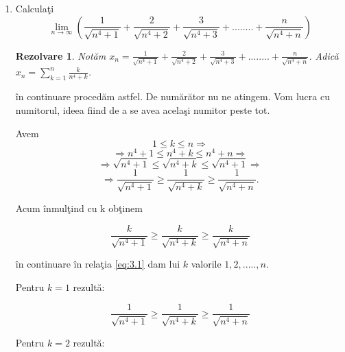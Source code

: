 \documentclass[a4paper,12pt,oneside]{report}
\newtheorem{solve}{Rezolvare}
\begin{document}
\begin{enumerate}
 \item Calcula\c ti
\begin{displaymath}
   \lim_{n\to\infty }\left ( \frac{1}{\sqrt{n^{4}+1}}+ \frac{2}{\sqrt{n^{4}+2} } +\frac{3}{\sqrt{n^{4}+3}}+........+\frac{n}{\sqrt{n^{4}+n}}  \right )
\end{displaymath}


\begin{solve}
  Not\u am \( x_{n}= \frac{1}{\sqrt{n^{4}+1}} + \frac{2}{\sqrt{n^{4}+2}}+\frac{3}{\sqrt{n^{4}+3}}+........+\frac{n}{\sqrt{n^{4}+n}} \).
Adic\u a \( x_{n}= \sum_{k=1}^{n}\frac{k}{n^{4}+k}\).
\end{solve}


\^ in continuare proced\u am astfel. De num\u ar\u ator nu ne atingem. Vom lucra cu numitorul, ideea fiind de a se avea acela\c si numitor peste tot. 

Avem 
\begin{displaymath}
  1\leq k\leq n \Rightarrow 
\end{displaymath}
\begin{displaymath}
  \Rightarrow  n^{4}+1 \leq n^{4}+k \leq n^{4}+n \Rightarrow 
\end{displaymath}
\begin{displaymath}
  \Rightarrow  \sqrt{n^{4}+1}\leq \sqrt{n^{4}+k}\leq \sqrt{n^{4}+1} \Rightarrow 
\end{displaymath}
\begin{displaymath}
  \Rightarrow  \frac{1}{\sqrt{n^{4}+1}}\geq \frac{1}{\sqrt{n^{4}+k}}\geq \frac{1}{\sqrt{n^{4}+n}}.
\end{displaymath}


Acum \^ inmul\c tind cu k ob\c tinem 

\begin{displaymath}
  \frac{k}{\sqrt{n^{4}+1}}\geq \frac{k}{\sqrt{n^{4}+k}}\geq \frac{k}{\sqrt{n^{4}+n}} \label{eq:3.1} \tag{3.1} 
\end{displaymath}


\^ in continuare \^ in rela\c tia \ref{eq:3.1} dam lui \(k\) valorile \(1,2,.....,n\). 

Pentru \(k = 1\) rezult\u a:

\begin{displaymath}
  \frac{1}{\sqrt{n^{4}+1}}\geq \frac{1}{\sqrt{n^{4}+k}}\geq \frac{1}{\sqrt{n^{4}+n}} 
\end{displaymath}


Pentru \(k = 2\) rezult\u a:


\end{enumerate}
\end{document}
